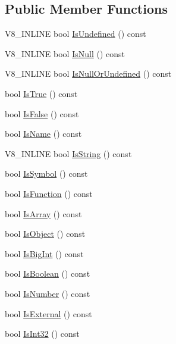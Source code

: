 \subsection*{Public Member Functions}
\begin{DoxyCompactItemize}
\item 
V8\+\_\+\+I\+N\+L\+I\+NE bool \mbox{\hyperlink{classv8_1_1Value_ad3a7686feef02fbe0317570b9640b078}{Is\+Undefined}} () const
\item 
V8\+\_\+\+I\+N\+L\+I\+NE bool \mbox{\hyperlink{classv8_1_1Value_a7710cf2aca870e961f1df65ef6057eb4}{Is\+Null}} () const
\item 
V8\+\_\+\+I\+N\+L\+I\+NE bool \mbox{\hyperlink{classv8_1_1Value_a47bb1e442bf9741e9e29468659e8cdba}{Is\+Null\+Or\+Undefined}} () const
\item 
bool \mbox{\hyperlink{classv8_1_1Value_a48c300598bad0155eb59965c9e6b86b6}{Is\+True}} () const
\item 
bool \mbox{\hyperlink{classv8_1_1Value_a84b6682c5582e0ae14d85bd9b6f25522}{Is\+False}} () const
\item 
bool \mbox{\hyperlink{classv8_1_1Value_a1ae3d5f5823705d2b6c26378201b772b}{Is\+Name}} () const
\item 
V8\+\_\+\+I\+N\+L\+I\+NE bool \mbox{\hyperlink{classv8_1_1Value_a6c7582919eec6f30e865b3300eff9a8e}{Is\+String}} () const
\item 
bool \mbox{\hyperlink{classv8_1_1Value_a0fee90dc2589b156d277a74b0b225a71}{Is\+Symbol}} () const
\item 
bool \mbox{\hyperlink{classv8_1_1Value_ac7a649d482c41cfc6281a4215a091a6d}{Is\+Function}} () const
\item 
bool \mbox{\hyperlink{classv8_1_1Value_a4908fac2c2888ade5d05a8dd312e1fd7}{Is\+Array}} () const
\item 
bool \mbox{\hyperlink{classv8_1_1Value_a72a01e06e897a8fedbb430cdd7fc3ffe}{Is\+Object}} () const
\item 
bool \mbox{\hyperlink{classv8_1_1Value_a19fe27cd498d16f014b6f40038ff96ef}{Is\+Big\+Int}} () const
\item 
bool \mbox{\hyperlink{classv8_1_1Value_a7ab7130b87a1fbcced76268353fae00b}{Is\+Boolean}} () const
\item 
bool \mbox{\hyperlink{classv8_1_1Value_a6ef42a28c0bc70022acb7e308bda4e19}{Is\+Number}} () const
\item 
bool \mbox{\hyperlink{classv8_1_1Value_a908070323b8cd593127141a22b79e39d}{Is\+External}} () const
\item 
bool \mbox{\hyperlink{classv8_1_1Value_ad5d58df1d978b4d9875eb97b3bebfc29}{Is\+Int32}} () const

\end{DoxyCompactItemize}
